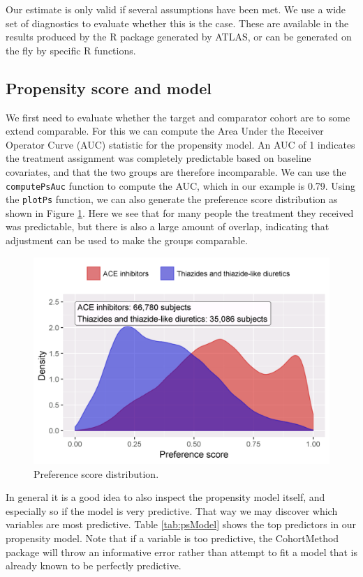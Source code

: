 \documentclass[]{book}
\begin{document}
Our estimate is only valid if several assumptions have been met. We use
a wide set of diagnostics to evaluate whether this is the case. These
are available in the results produced by the R package generated by
ATLAS, or can be generated on the fly by specific R functions.

\subsection{Propensity score and
model}\label{propensity-score-and-model}

We first need to evaluate whether the target and comparator cohort are
to some extend comparable. For this we can compute the Area Under the
Receiver Operator Curve (AUC) statistic for the propensity model. An AUC
of 1 indicates the treatment assignment was completely predictable based
on baseline covariates, and that the two groups are therefore
incomparable. We can use the \texttt{computePsAuc} function to compute
the AUC, which in our example is 0.79. Using the \texttt{plotPs}
function, we can also generate the preference score distribution as
shown in Figure \ref{fig:ps}. Here we see that for many people the
treatment they received was predictable, but there is also a large
amount of overlap, indicating that adjustment can be used to make the
groups comparable.

\begin{figure}

{\centering \includegraphics[width=0.8\linewidth]{images/PopulationLevelEstimation/ps} 

}

\caption{Preference score distribution.}\label{fig:ps}
\end{figure}

In general it is a good idea to also inspect the propensity model
itself, and especially so if the model is very predictive. That way we
may discover which variables are most predictive. Table
\ref{tab:psModel} shows the top predictors in our propensity model. Note
that if a variable is too predictive, the CohortMethod package will
throw an informative error rather than attempt to fit a model that is
already known to be perfectly predictive.
\end{document}

